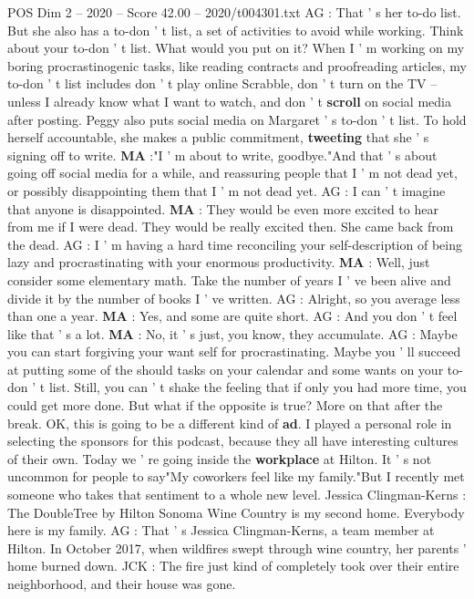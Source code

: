 \begin{textsample}{POS Dim 2 – 2020 – Score 42.00 – 2020/t004301.txt}
AG : That ' s her to-do list.
But she also has a to-don ' t list, a set of activities to avoid while working.
Think about your to-don ' t list.
What would you put on it?
When I ' m working on my boring procrastinogenic tasks, like reading contracts and proofreading articles, my to-don ' t list includes don ' t play online Scrabble, don ' t turn on the TV -- unless I already know what I want to watch, and don ' t \textbf{scroll} on social media after posting.
Peggy also puts social media on Margaret ' s to-don ' t list.
To hold herself accountable, she makes a public commitment, \textbf{tweeting} that she ' s signing off to write. \textbf{MA} :"I ' m about to write, goodbye."And that ' s about going off social media for a while, and reassuring people that I ' m not dead yet, or possibly disappointing them that I ' m not dead yet.
AG : I can ' t imagine that anyone is disappointed. \textbf{MA} : They would be even more excited to hear from me if I were dead.
They would be really excited then.
She came back from the dead.
AG : I ' m having a hard time reconciling your self-description of being lazy and procrastinating with your enormous productivity. \textbf{MA} : Well, just consider some elementary math.
Take the number of years I ' ve been alive and divide it by the number of books I ' ve written.
AG : Alright, so you average less than one a year. \textbf{MA} : Yes, and some are quite short.
AG : And you don ' t feel like that ' s a lot. \textbf{MA} : No, it ' s just, you know, they accumulate.
AG : Maybe you can start forgiving your want self for procrastinating.
Maybe you ' ll succeed at putting some of the should tasks on your calendar and some wants on your to-don ' t list.
Still, you can ' t shake the feeling that if only you had more time, you could get more done.
But what if the opposite is true?
More on that after the break.
OK, this is going to be a different kind of \textbf{ad}.
I played a personal role in selecting the sponsors for this podcast, because they all have interesting cultures of their own.
Today we ' re going inside the \textbf{workplace} at Hilton.
It ' s not uncommon for people to say"My coworkers feel like my family."But I recently met someone who takes that sentiment to a whole new level.
Jessica Clingman-Kerns : The DoubleTree by Hilton Sonoma Wine Country is my second home.
Everybody here is my family.
AG : That ' s Jessica Clingman-Kerns, a team member at Hilton.
In October 2017, when wildfires swept through wine country, her parents ' home burned down.
JCK : The fire just kind of completely took over their entire neighborhood, and their house was gone.

\end{textsample}
